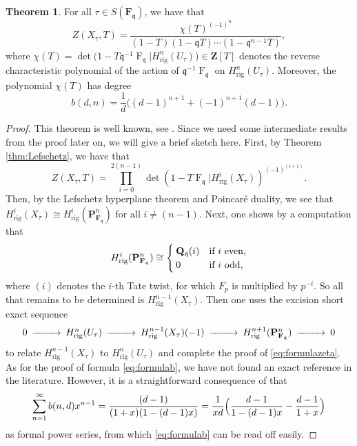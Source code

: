 \documentclass[a4paper,11pt]{article}
\numberwithin{equation}{section}
\newcommand{\ZZ}{\mathbf{Z}} %
\newcommand{\QQ}{\mathbf{Q}} %
\newcommand{\FF}{\mathbf{F}} %
\DeclareMathOperator{\Frob}{F}           %
\providecommand{\Hrig}{H_{\text{rig}}}  %
\theoremstyle{definition}
\newtheorem{thm}{Theorem}[section]
\begin{document}
\begin{thm} \label{thm:hypersurface} For all $\tau \in S(\FF_{\mathfrak{q}})$, we have that
\begin{equation} \label{eq:formulazeta}
Z(X_{\tau},T) = \frac{\chi(T)^{(-1)^n}}{(1 - T) (1 - \mathfrak{q}T) \dotsm (1 - \mathfrak{q}^{n-1}T)},
\end{equation}
where 
$\chi(T) = \det \bigl( 1 - T \mathfrak{q}^{-1} \Frob_{\mathfrak{q}} | \Hrig^n(U_{\tau}) \bigr) \in \ZZ[T]$
denotes the reverse characteristic polynomial of the action of $\mathfrak{q}^{-1} \Frob_{\mathfrak{q}}$ 
on $\Hrig^n(U_{\tau})$. Moreover, the polynomial $\chi(T)$ has degree 
\begin{equation} \label{eq:formulab}
b(d,n)=\frac{1}{d} \bigl((d-1)^{n+1} + (-1)^{n+1}(d-1) \bigr).
\end{equation}
\end{thm}

\begin{proof}
This theorem is well known, see \cite{AbbottKedlayaRoe2006}. Since we need some intermediate results from the
proof later on, we will give a brief sketch here. First, by Theorem \ref{thm:Lefschetz}, we have that
\[
Z(X_{\tau},T) = \prod_{i=0}^{2(n-1)} \det(1- T \Frob_{\mathfrak{q}} | \Hrig^i(X_{\tau}))^{(-1)^{(i+1)}}.
\]
Then, by the Lefschetz hyperplane theorem and Poincar\'e duality, we see that $\Hrig^i(X_{\tau}) \cong \Hrig^i(\mathbf{P}^n_{\FF_{\mathfrak{q}}})$ 
for all $i \neq (n-1)$. Next, one shows by a computation that
\begin{equation} \label{eqn:projcoho}
\Hrig^i(\mathbf{P}^n_{\FF_{\mathfrak{q}}}) 
\cong 
\begin{cases}
\QQ_{\mathfrak{q}}(i) &\mbox{if $i$ even,} \\
$0$ &\mbox{if $i$ odd,} 
\end{cases} 
\end{equation}
where $(i)$ denotes the $i$-th Tate twist, for which $F_p$ is multiplied by $p^{-i}$. So all that remains to be determined is $\Hrig^{n-1}(X_{\tau})$. 
Then one uses the excision short exact sequence
\begin{equation} \label{eqn:excision}
\begin{CD}
0 @>>> \Hrig^{n}(U_{\tau}) @>>> \Hrig^{n-1}(X_{\tau})(-1) @>>> \Hrig^{n+1}(\mathbf{P}^n_{\FF_{\mathfrak{q}}}) @>>> 0
\end{CD} 
\end{equation}
to relate $\Hrig^{n-1}(X_{\tau})$ to $\Hrig^{n}(U_{\tau})$ and complete the proof of \eqref{eq:formulazeta}. As for 
the proof of formula \eqref{eq:formulab}, we have not found an exact reference in the literature. However, it is
a straightforward consequence of \cite[Corollaire 2.4 (i)]{sga7} that
\[
\sum_{n=1}^{\infty} b(n,d) x^{n-1} = \frac{(d-1)}{(1+x)(1-(d-1)x)} = \frac{1}{xd} \Bigl( \frac{d-1}{1-(d-1)x} - \frac{d-1}{1+x} \Bigr)
\] 
as formal power series, from which \eqref{eq:formulab} can be read off easily. 
\end{proof}
\end{document}
